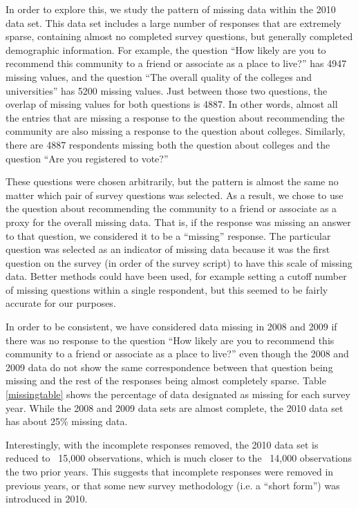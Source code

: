 \documentclass[smallextended]{svjour3}\usepackage[]{graphicx}\usepackage[]{color}
\begin{document}
In order to explore this, we study the pattern of missing data within the 2010 data set. This data set includes a large number of responses that are extremely sparse, containing almost no completed survey questions, but generally completed demographic information. For example, the question ``How likely are you to recommend this community to a friend or associate as a place to live?'' has 4947 missing values, and the question ``The overall quality of the colleges and universities'' has 5200 missing values. Just between those two questions, the overlap of missing values for both questions is 4887. In other words, almost all the entries that are missing a response to the question about recommending the community are also missing a response to the question about colleges. Similarly, there are 4887 respondents missing both the question about colleges and the question ``Are you registered to vote?''

These questions were chosen arbitrarily, but the pattern is almost the same no matter which pair of survey questions was selected. As a result, we chose to use the question about recommending the community to a friend or associate as a proxy for the overall missing data. That is, if the response was missing an answer to that question, we considered it to be a ``missing'' response. The particular question was selected as an indicator of missing data because it was the first question on the survey (in order of the survey script) to have this scale of missing data. Better methods could have been used, for example setting a cutoff number of missing questions within a single respondent, but this seemed to be fairly accurate for our purposes. 

In order to be consistent, we have considered data missing in 2008 and 2009 if there was no response to the question ``How likely are you to recommend this community to a friend or associate as a place to live?'' even though the 2008 and 2009 data do not show the same correspondence between that question being missing and the rest of the responses being almost completely sparse. Table \ref{missingtable} shows the percentage of data designated as missing for each survey year. While the 2008 and 2009 data sets are almost complete, the 2010 data set has about 25\% missing data.

Interestingly, with the incomplete responses removed, the 2010 data set is reduced to ~15,000 observations, which is much closer to the ~14,000 observations the two prior years. This suggests that incomplete responses were removed in previous years, or that some new survey methodology (i.e. a ``short form'') was introduced in 2010. 
\end{document}
